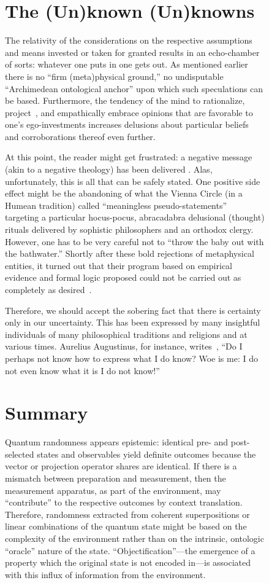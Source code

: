 \documentclass[entropy,article,accept,oneauthor,pdftex]{Definitions/mdpi}
\begin{document}
\begin{figure}[H]
\section{The (Un)known (Un)knowns}

The relativity of the considerations on the respective assumptions and means invested or taken for granted results in
an echo-chamber of sorts: whatever one puts in one gets out.
As mentioned earlier there is no ``firm (meta)physical ground,'' no undisputable
``Archimedean ontological anchor'' upon which such speculations can be based.
Furthermore, the tendency of the mind to rationalize, project~\cite{Jaynes1990,Freud-1912,Freud-1912-e}, and empathically
embrace opinions that are favorable to one's ego-investments
increases delusions about particular beliefs and corroborations thereof even further.


At this point, the reader might get frustrated: a negative message (akin to a negative theology)
has been delivered
.
Alas, unfortunately, this is all that can be safely stated.  One positive side effect might be the abandoning of what the Vienna Circle (in a Humean tradition) called
``meaningless pseudo-statements''~\cite{Hahn1930,Carnap1931,Carnap-1931-engl}
targeting a particular hocus-pocus, abracadabra delusional (thought) rituals delivered by sophistic philosophers and an orthodox clergy.
However, one has to be very careful not to ``throw the baby out with the bathwater.''
Shortly after these bold rejections of metaphysical entities,
it turned out that their program based on empirical evidence and formal logic proposed could not be carried out as completely as
desired~\cite{godel1,turing-36-1,turing-36-2,smullyan-92,Smullyan1993-SMURTF,book:486992,chaitin3}.

Therefore, we should accept the sobering fact that there is certainty only in our uncertainty.
This has been expressed by many insightful individuals of many philosophical traditions and religions and at various times.
Aurelius Augustinus, for instance, writes~\cite[Book~XI, chapter~25.32]{Augustinus-Confessiones},
``Do I perhaps not know how to express what I do know?
Woe is me: I do not even know what it is I do not know!''

\section{Summary}

Quantum randomness appears epistemic:
identical pre- and post-selected states and observables yield definite outcomes
because the vector or projection operator shares are identical.
If there is a mismatch between preparation and measurement, then the measurement apparatus, as part of the environment,
may ``contribute'' to the respective outcomes by context translation.
Therefore, randomness extracted from coherent superpositions or linear combinations of the quantum state might be based on
the complexity of the environment rather than on the intrinsic, ontologic ``oracle'' nature of the state.
``Objectification''---the emergence of a property which the original state is not encoded in---is
associated with this influx of information from the environment.


\end{figure}
\end{document}
